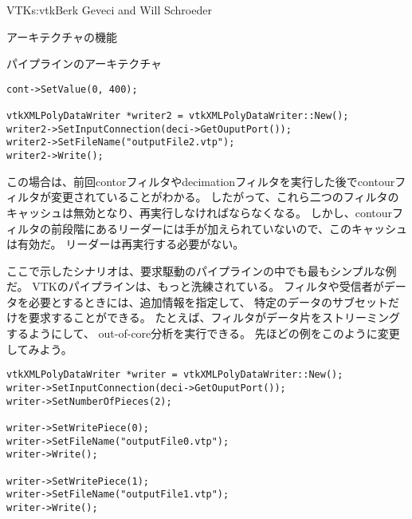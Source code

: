 \begin{aosachapter}{VTK}{s:vtk}{Berk Geveci and Will Schroeder}
\begin{aosasect1}{アーキテクチャの機能}
\begin{aosasect2}{パイプラインのアーキテクチャ}
\begin{verbatim}
cont->SetValue(0, 400);

vtkXMLPolyDataWriter *writer2 = vtkXMLPolyDataWriter::New();
writer2->SetInputConnection(deci->GetOuputPort());
writer2->SetFileName("outputFile2.vtp");
writer2->Write();
\end{verbatim}

この場合は、前回contorフィルタやdecimationフィルタを実行した後でcontourフィルタが変更されていることがわかる。
したがって、これら二つのフィルタのキャッシュは無効となり、再実行しなければならなくなる。
しかし、contourフィルタの前段階にあるリーダーには手が加えられていないので、このキャッシュは有効だ。
リーダーは再実行する必要がない。

ここで示したシナリオは、要求駆動のパイプラインの中でも最もシンプルな例だ。
VTKのパイプラインは、もっと洗練されている。
フィルタや受信者がデータを必要とするときには、追加情報を指定して、
特定のデータのサブセットだけを要求することができる。
たとえば、フィルタがデータ片をストリーミングするようにして、
out-of-core分析を実行できる。
先ほどの例をこのように変更してみよう。

\begin{verbatim}
vtkXMLPolyDataWriter *writer = vtkXMLPolyDataWriter::New();
writer->SetInputConnection(deci->GetOuputPort());
writer->SetNumberOfPieces(2);

writer->SetWritePiece(0);
writer->SetFileName("outputFile0.vtp");
writer->Write();

writer->SetWritePiece(1);
writer->SetFileName("outputFile1.vtp");
writer->Write();
\end{verbatim}


\end{aosasect2}
\end{aosasect1}
\end{aosachapter}
